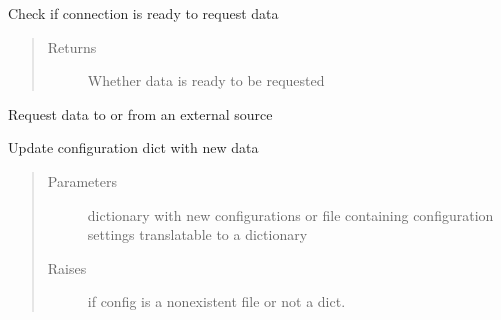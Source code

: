 \documentclass[letterpaper,10pt,english]{sphinxmanual}
\begin{document}
\begin{fulllineitems}
\begin{fulllineitems}
\begin{quote}
\begin{description}
\end{description}\end{quote}

\end{fulllineitems}


\begin{fulllineitems}
\label{\detokenize{dalio.external:dalio.external.external.External.check}}
Check if connection is ready to request data
\begin{quote}\begin{description}
\item[{Returns}] \leavevmode
Whether data is ready to be requested

\end{description}\end{quote}

\end{fulllineitems}


\begin{fulllineitems}
\label{\detokenize{dalio.external:dalio.external.external.External.request}}
Request data to or from an external source

\end{fulllineitems}


\begin{fulllineitems}
\label{\detokenize{dalio.external:dalio.external.external.External.update_config}}
Update configuration dict with new data
\begin{quote}\begin{description}
\item[{Parameters}] \leavevmode
{} \textendash{} dictionary with new configurations or file containing
configuration settings translatable to a dictionary

\item[{Raises}] \leavevmode
{} \textendash{} if config is a non\sphinxhyphen{}existent file or not a dict.

\end{description}\end{quote}

\end{fulllineitems}


\end{fulllineitems}
\end{document}

